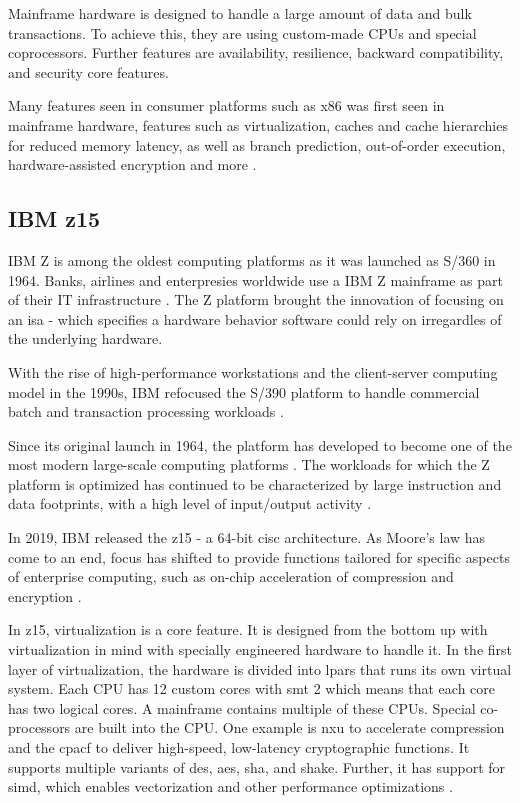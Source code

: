 Mainframe hardware is designed to handle a large amount of data and bulk transactions. To achieve this, they are using custom-made CPUs and special coprocessors. Further features are availability, resilience, backward compatibility, and security core features.

Many features seen in consumer platforms such as x86 was first seen in mainframe hardware, features such as virtualization, caches and cache hierarchies for reduced memory latency, as well as branch prediction, out-of-order execution, hardware-assisted encryption and more \cite{jacobi2020}.

\subsection{IBM z15}

IBM Z is among the oldest computing platforms as it was launched as S/360 in 1964. Banks, airlines and enterpresies worldwide use a IBM Z mainframe as part of their IT infrastructure \cite{jacobi2020}. The Z platform brought the innovation of focusing on an \acrfull{isa} - which specifies a hardware behavior software could rely on irregardles of the underlying hardware.

With the rise of high-performance workstations and the client-server computing model in the 1990s, IBM refocused the S/390 platform to handle commercial batch and transaction processing workloads \cite{jacobi2020}. 

Since its original launch in 1964, the platform has developed to become one of the most modern large-scale computing platforms \cite{jacobi2020}. The workloads for which the Z platform is optimized has continued to be characterized by large instruction and data footprints, with a high level of input/output activity \cite{jacobi2020}.

In 2019, IBM released the \gls{z15} \cite{jacobi2020} - a 64-bit \gls{cisc} architecture. As Moore's law has come to an end, focus has shifted to provide functions tailored for specific aspects of enterprise computing, such as on-chip acceleration of compression and encryption \cite{jacobi2020}.

In \gls{z15}, virtualization is a core feature. It is designed from the bottom up with virtualization in mind with specially engineered hardware to handle it. In the first layer of virtualization, the hardware is divided into \glspl{lpar} that runs its own virtual system. Each CPU has 12 custom cores with \gls{smt} 2 which means that each core has two logical cores. A mainframe contains multiple of these CPUs. Special co-processors are built into the CPU. One example is \gls{nxu} to accelerate compression and the \gls{cpacf} to deliver high-speed, low-latency cryptographic functions. It supports multiple variants of \gls{des}, \gls{aes}, \gls{sha}, and \gls{shake}. Further, it has support for \gls{simd}, which enables vectorization and other performance optimizations  \cite{redbook:z15}.

